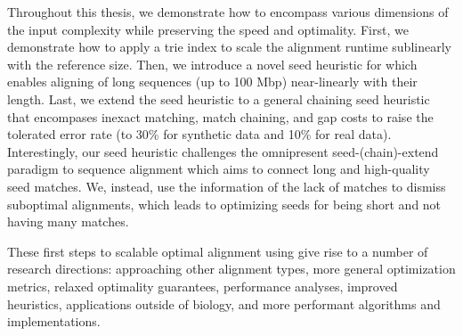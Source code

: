 Throughout this thesis, we demonstrate how to encompass various dimensions of
the input complexity while preserving the speed and optimality. First, we
demonstrate how to apply a trie index to scale the alignment runtime sublinearly
with the reference size. Then, we introduce a novel seed heuristic for \A which
enables aligning of long sequences (up to 100 Mbp) near-linearly with their
length. Last, we extend the seed heuristic to a general chaining seed heuristic
that encompases inexact matching, match chaining, and gap costs to raise the
tolerated error rate (to 30\% for synthetic data and 10\% for real data).
Interestingly, our seed heuristic challenges the omnipresent seed-(chain)-extend
paradigm to sequence alignment which aims to connect long and high-quality seed
matches. We, instead, use the information of the lack of matches to dismiss
suboptimal alignments, which leads to optimizing seeds for being short and not
having many matches.

These first steps to scalable optimal alignment using \A give rise to a number
of research directions: approaching other alignment types, more general
optimization metrics, relaxed optimality guarantees, performance analyses,
improved heuristics, applications outside of biology, and more performant
algorithms and implementations.